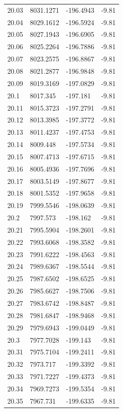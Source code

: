 \begin{table}[H]
\begin{tabular}{llll}
20.03 & 8031.1271 & -196.4943 & -9.81 \\
20.04 & 8029.1612 & -196.5924 & -9.81 \\
20.05 & 8027.1943 & -196.6905 & -9.81 \\
20.06 & 8025.2264 & -196.7886 & -9.81 \\
20.07 & 8023.2575 & -196.8867 & -9.81 \\
20.08 & 8021.2877 & -196.9848 & -9.81 \\
20.09 & 8019.3169 & -197.0829 & -9.81 \\
20.1 & 8017.345 & -197.181 & -9.81 \\
20.11 & 8015.3723 & -197.2791 & -9.81 \\
20.12 & 8013.3985 & -197.3772 & -9.81 \\
20.13 & 8011.4237 & -197.4753 & -9.81 \\
20.14 & 8009.448 & -197.5734 & -9.81 \\
20.15 & 8007.4713 & -197.6715 & -9.81 \\
20.16 & 8005.4936 & -197.7696 & -9.81 \\
20.17 & 8003.5149 & -197.8677 & -9.81 \\
20.18 & 8001.5352 & -197.9658 & -9.81 \\
20.19 & 7999.5546 & -198.0639 & -9.81 \\
20.2 & 7997.573 & -198.162 & -9.81 \\
20.21 & 7995.5904 & -198.2601 & -9.81 \\
20.22 & 7993.6068 & -198.3582 & -9.81 \\
20.23 & 7991.6222 & -198.4563 & -9.81 \\
20.24 & 7989.6367 & -198.5544 & -9.81 \\
20.25 & 7987.6502 & -198.6525 & -9.81 \\
20.26 & 7985.6627 & -198.7506 & -9.81 \\
20.27 & 7983.6742 & -198.8487 & -9.81 \\
20.28 & 7981.6847 & -198.9468 & -9.81 \\
20.29 & 7979.6943 & -199.0449 & -9.81 \\
20.3 & 7977.7028 & -199.143 & -9.81 \\
20.31 & 7975.7104 & -199.2411 & -9.81 \\
20.32 & 7973.717 & -199.3392 & -9.81 \\
20.33 & 7971.7227 & -199.4373 & -9.81 \\
20.34 & 7969.7273 & -199.5354 & -9.81 \\
20.35 & 7967.731 & -199.6335 & -9.81 \\

\end{tabular}
\end{table}
